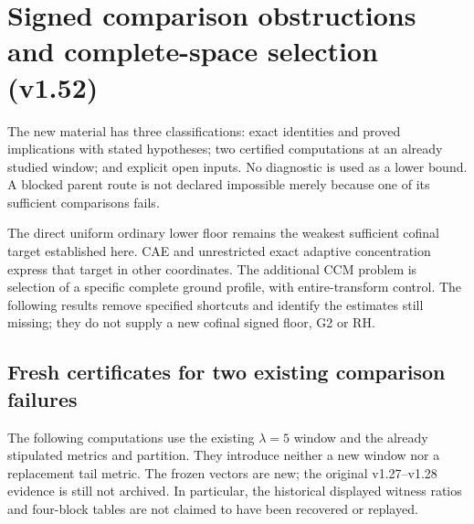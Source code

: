 \section{Signed comparison obstructions and complete-space selection (v1.52)}
\label{sec:v152-route-selection}
The new material has three classifications: exact identities and proved
implications with stated hypotheses; two certified computations at an
already studied window; and explicit open inputs. No diagnostic is used
as a lower bound. A blocked parent route is not declared impossible
merely because one of its sufficient comparisons fails.

The direct uniform ordinary lower floor remains the weakest sufficient
cofinal target established here. CAE and unrestricted exact adaptive
concentration express that target in other coordinates. The additional
CCM problem is selection of a specific complete ground profile, with
entire-transform control. The following results remove specified
shortcuts and identify the estimates still missing; they do not supply
a new cofinal signed floor, G2 or RH.



\subsection*{Fresh certificates for two existing comparison failures}

The following computations use the existing $\lambda=5$ window and
the already stipulated metrics and partition. They introduce neither a
new window nor a replacement tail metric. The frozen vectors are new;
the original v1.27--v1.28 evidence is still not archived. In particular,
the historical displayed witness ratios and four-block tables are not
claimed to have been recovered or replayed.

